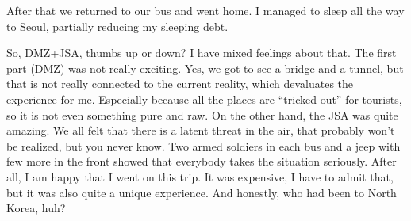 \begin{post}
\begin{content}

After that we returned to our bus and went home. I managed to sleep all the way to Seoul, partially reducing my sleeping debt.

\begin{figure}
\vspace{-12pt}
\centering{}
\vspace{-24pt}
\end{figure}So, DMZ+JSA, thumbs up or down? I have mixed feelings about that. The first part (DMZ) was not really exciting. Yes, we got to see a bridge and a tunnel, but that is not really connected to the current reality, which devaluates the experience for me. Especially because all the places are ``tricked out'' for tourists, so it is not even something pure and raw. On the other hand, the JSA was quite amazing. We all felt that there is a latent threat in the air, that probably won't be realized, but you never know. Two armed soldiers in each bus and a jeep with few more in the front showed that everybody takes the situation seriously. After all, I am happy that I went on this trip. It was expensive, I have to admit that, but it was also quite a unique experience. And honestly, who had been to North Korea, huh?
	\end{content}
\end{post}
